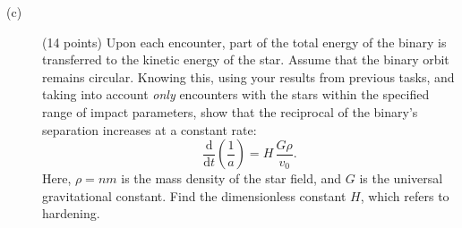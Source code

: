 \begin{description}
\item[(c)] (14 points) Upon each encounter, part of the total energy of the
  binary is transferred to the kinetic energy of the star. Assume that the
  binary orbit remains circular. Knowing this, using your results from
  previous tasks, and taking into account \emph{only} encounters with the
  stars within the specified range of impact parameters, show that the
  reciprocal of the binary's separation increases at a constant rate:
  \[ \frac{\mathrm{d}}{\mathrm{d}t}\left(\frac{1}{a}\right)
     = H\,\frac{G\rho}{v_0}. \]
  Here, $\rho = nm$ is the mass density of the star field, and $G$ is the
  universal gravitational constant. Find the dimensionless constant $H$,
  which refers to hardening.
\end{description}
